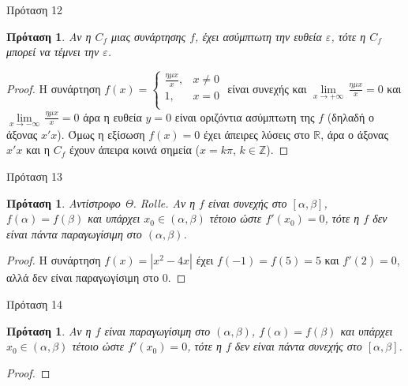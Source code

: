 \documentclass[greek]{beamer}
\newtheorem{proposition}[theorem]{Πρόταση}
\begin{document}
\begin{frame}{Πρόταση 12}
 \begin{proposition}
  \normalfont Αν η ${{C}_{f}}$ μιας συνάρτησης $f$, έχει ασύμπτωτη την ευθεία $\varepsilon $, τότε η ${{C}_{f}}$ μπορεί να τέμνει την $\varepsilon $.
 \end{proposition}
 \begin{proof}
  Η συνάρτηση $f\left( x \right)=\left\{ \begin{array}{*{35}{l}}
    \frac{\eta \mu x}{x}, & x\ne 0 \\
    1,                    & x=0    \\
   \end{array} \right.$ είναι συνεχής και $\underset{x\to +\infty }{\mathop{\lim }}\,\frac{\eta \mu x}{x}=0$ και $\underset{x\to -\infty }{\mathop{\lim }}\,\frac{\eta \mu x}{x}=0$
  άρα η ευθεία $y=0$ είναι οριζόντια ασύμπτωτη της $f$ (δηλαδή ο άξονας $x'x$). Όμως η εξίσωση $f\left( x \right)=0$ έχει άπειρες λύσεις στο $\mathbb{R}$, άρα ο άξονας $x'x$ και η ${{C}_{f}}$ έχουν άπειρα κοινά σημεία ($x=k\pi $, $k\in \mathbb{Z}$).
 \end{proof}
\end{frame}

\begin{frame}{Πρόταση 13}
 \begin{proposition}
  \normalfont Αντίστροφο Θ. Rolle. Αν η $f$ είναι συνεχής στο $\left[ \alpha ,\beta  \right]$, $f\left( \alpha  \right)=f\left( \beta  \right)$ και υπάρχει ${{x}_{0}}\in \left( \alpha ,\beta  \right)$ τέτοιο ώστε $f'\left( {{x}_{0}} \right)=0$, τότε η $f$ δεν είναι πάντα παραγωγίσιμη στο $\left( \alpha ,\beta  \right)$.
 \end{proposition}
 \begin{proof}
  Η συνάρτηση $f\left( x \right)=\left| {{x}^{2}}-4x \right|$ έχει $f\left( -1 \right)=f\left( 5 \right)=5$ και $f'\left( 2 \right)=0$, αλλά δεν είναι παραγωγίσιμη στο $0$.
 \end{proof}
\end{frame}

\begin{frame}{Πρόταση 14}
 \begin{proposition}
  \normalfont Αν η $f$ είναι παραγωγίσιμη στο $\left( \alpha ,\beta  \right)$, $f\left( \alpha  \right)=f\left( \beta  \right)$ και υπάρχει ${{x}_{0}}\in \left( \alpha ,\beta  \right)$ τέτοιο ώστε $f'\left( x_0 \right)=0$, τότε η $f$ δεν είναι πάντα συνεχής στο $\left[ \alpha ,\beta  \right]$.
 \end{proposition}
 \begin{proof}
 \end{proof}
\end{frame}
\end{document}
